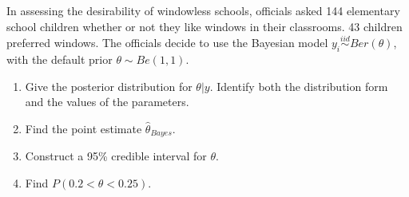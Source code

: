   \item 
    In assessing the desirability of windowless schools, officials asked 144
    elementary school children whether or not they like windows in their
    classrooms. 43 children preferred windows. The officials decide to use the Bayesian model $y_i\stackrel{iid}{\sim}Ber(\theta)$, with the default prior $\theta \sim Be(1,1)$.
    \begin{enumerate}
      \item Give the posterior distribution for $ \theta | y$. Identify both the distribution form and the values of the parameters. 
      \item Find the point estimate $\hat{\theta}_{Bayes}$. 
      \item Construct a 95\% credible interval for $\theta$. 
      \item Find $P(0.2<\theta<0.25)$.
\end{enumerate}

